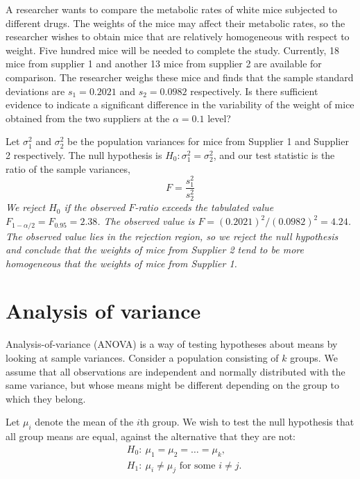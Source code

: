 \begin{exercise}%
A researcher wants to compare the metabolic rates of white mice subjected to different drugs. The weights of the mice may affect their metabolic rates, so the researcher wishes to obtain mice that are relatively homogeneous with respect to weight. Five hundred mice will be needed to complete the study. Currently, 18 mice from supplier 1 and another 13 mice from supplier 2 are available for comparison. The researcher weighs these mice and finds that the sample standard deviations are $s_1=0.2021$ and $s_2=0.0982$ respectively. Is there sufficient evidence to indicate a significant difference in the variability of the weight of mice obtained from the two suppliers at the $\alpha=0.1$ level?
\begin{answer}
Let $\sigma^2_1$ and $\sigma^2_2$ be the population variances for mice from Supplier 1 and Supplier 2 respectively. The null hypothesis is $H_0:\sigma^2_1=\sigma^2_2$, and our test statistic is the ratio of the sample variances,
\[
F = \frac{s^2_1}{s^2_2}
\]
\bit
\it We reject $H_0$ if the observed $F$-ratio exceeds the tabulated value $F_{1-\alpha/2}=F_{0.95} = 2.38$.
\it The observed value is $F=(0.2021)^2/(0.0982)^2=4.24$.
\eit
The observed value lies in the rejection region, so we reject the null hypothesis and conclude that the weights of mice from Supplier 2 tend to be more homogeneous that the weights of mice from Supplier 1.
\end{answer}
\end{exercise}

\section{Analysis of variance}\label{sec:anova}

Analysis-of-variance (ANOVA) is a way of testing hypotheses about means by looking at sample variances. Consider a population consisting of $k$ groups. We assume that all observations are independent and normally distributed with the same variance, but whose means might be different depending on the group to which they belong. 

\medskip
Let $\mu_i$ denote the mean of the $i$th group. We wish to test the null hypothesis that all group means are equal, against the alternative that they are not:
\begin{align*}
& H_0:\ \mu_1=\mu_2=\ldots=\mu_k, \\
& H_1:\ \mu_i\neq\mu_j \text{ for some } i\neq j.
\end{align*}

